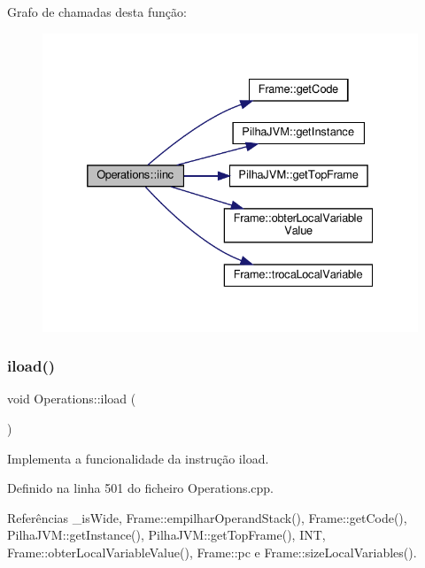 Grafo de chamadas desta função\+:\nopagebreak
\begin{figure}[H]
\begin{center}
\leavevmode
\includegraphics[width=332pt]{classOperations_a9934f9369192b10a978c7d6950592c42_cgraph}
\end{center}
\end{figure}
\mbox{\label{classOperations_a84e70afc25fa4e54a7e2bffae742222a}} 
\subsubsection{\texorpdfstring{iload()}{iload()}}
{\footnotesize\ttfamily void Operations\+::iload (\begin{DoxyParamCaption}{ }\end{DoxyParamCaption})\hspace{0.3cm}{\ttfamily [private]}}



Implementa a funcionalidade da instrução iload. 



Definido na linha 501 do ficheiro Operations.\+cpp.



Referências \+\_\+is\+Wide, Frame\+::empilhar\+Operand\+Stack(), Frame\+::get\+Code(), Pilha\+J\+V\+M\+::get\+Instance(), Pilha\+J\+V\+M\+::get\+Top\+Frame(), I\+NT, Frame\+::obter\+Local\+Variable\+Value(), Frame\+::pc e Frame\+::size\+Local\+Variables().




